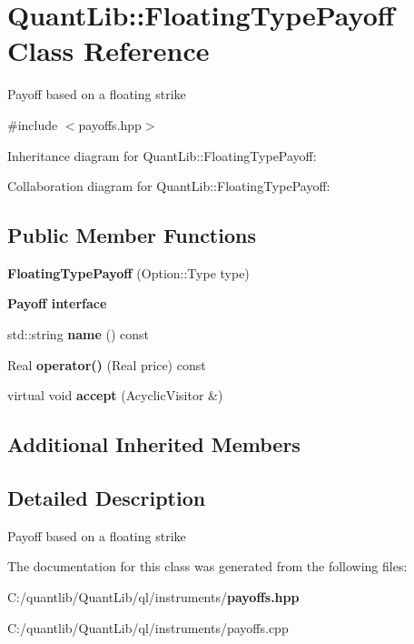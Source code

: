 \section{Quant\+Lib\+:\+:Floating\+Type\+Payoff Class Reference}
\label{class_quant_lib_1_1_floating_type_payoff}


Payoff based on a floating strike  




{\ttfamily \#include $<$payoffs.\+hpp$>$}



Inheritance diagram for Quant\+Lib\+:\+:Floating\+Type\+Payoff\+:


Collaboration diagram for Quant\+Lib\+:\+:Floating\+Type\+Payoff\+:
\subsection*{Public Member Functions}
\begin{DoxyCompactItemize}
\item 
{\bfseries Floating\+Type\+Payoff} (Option\+::\+Type type)\label{class_quant_lib_1_1_floating_type_payoff_a771d2144c8e5f371c1e1d64ff5a1e068}

\end{DoxyCompactItemize}
\begin{Indent}{\bf Payoff interface}\par
\begin{DoxyCompactItemize}
\item 
std\+::string {\bfseries name} () const \label{class_quant_lib_1_1_floating_type_payoff_a02b5a0ccd22e2a876bca2c2de5e7b6fa}

\item 
Real {\bfseries operator()} (Real price) const \label{class_quant_lib_1_1_floating_type_payoff_a4b6a163d348f2685b9aecea3f7f09164}

\item 
virtual void {\bfseries accept} (Acyclic\+Visitor \&)\label{class_quant_lib_1_1_floating_type_payoff_ae937a0aeb797cafe738e8bda3e6b076d}

\end{DoxyCompactItemize}
\end{Indent}
\subsection*{Additional Inherited Members}


\subsection{Detailed Description}
Payoff based on a floating strike 

The documentation for this class was generated from the following files\+:\begin{DoxyCompactItemize}
\item 
C\+:/quantlib/\+Quant\+Lib/ql/instruments/{\bf payoffs.\+hpp}\item 
C\+:/quantlib/\+Quant\+Lib/ql/instruments/payoffs.\+cpp\end{DoxyCompactItemize}
